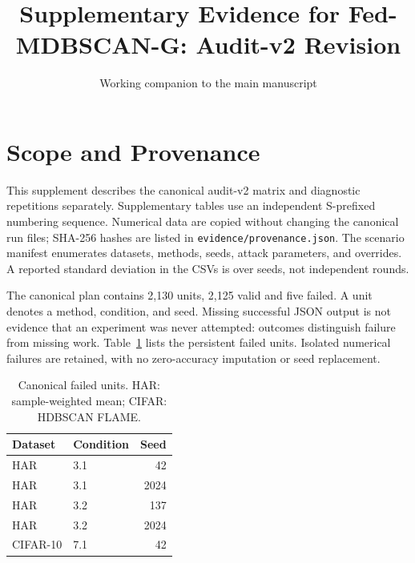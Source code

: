 \documentclass[journal]{IEEEtran}
\begin{document}
\title{Supplementary Evidence for Fed-MDBSCAN-G: Audit-v2 Revision}
\author{Working companion to the main manuscript}
\maketitle
\renewcommand{\thetable}{S\arabic{table}}
\section{Scope and Provenance}
This supplement describes the canonical audit-v2 matrix and diagnostic repetitions separately. Supplementary tables use an independent S-prefixed numbering sequence. Numerical data are copied without changing the canonical run files; SHA-256 hashes are listed in \texttt{evidence/provenance.json}. The scenario manifest enumerates datasets, methods, seeds, attack parameters, and overrides. A reported standard deviation in the CSVs is over seeds, not independent rounds.

The canonical plan contains 2,130 units, 2,125 valid and five failed. A unit denotes a method, condition, and seed. Missing successful JSON output is not evidence that an experiment was never attempted: outcomes distinguish failure from missing work. Table~\ref{tab:failed} lists the persistent failed units. Isolated numerical failures are retained, with no zero-accuracy imputation or seed replacement.
\begin{table}[!t]
\centering\footnotesize
\caption{Canonical failed units. HAR: sample-weighted mean; CIFAR: HDBSCAN FLAME.}\label{tab:failed}
\begin{tabular}{llr}\toprule Dataset & Condition & Seed\\\midrule
HAR & 3.1 & 42\\ HAR & 3.1 & 2024\\ HAR & 3.2 & 137\\ HAR & 3.2 & 2024\\ CIFAR-10 & 7.1 & 42\\\bottomrule
\end{tabular}\end{table}
\end{document}
